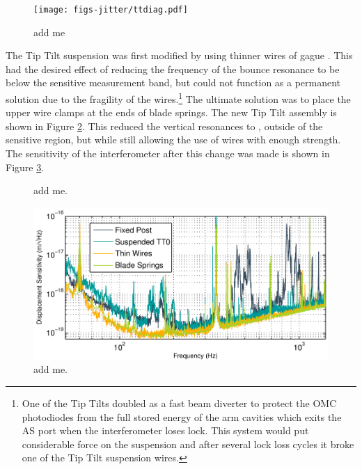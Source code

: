 \begin{figure}
  \begin{center}
  \leavevmode
  \texttt{[image: figs-jitter/ttdiag.pdf]}
  \end{center}
  \caption[add me]{add me}
  \label{fig:ttdiag}
\end{figure}

The Tip Tilt suspension was first modified by using thinner wires of gague . %
This had the desired effect of reducing the frequency of the bounce resonance to be below the sensitive measurement band, but could not function as a permanent solution due to the fragility of the wires.\footnote{One of the Tip Tilts doubled as a fast beam diverter to protect the OMC photodiodes from the full stored energy of the arm cavities which exits the AS port when the interferometer loses lock. %
This system would put considerable force on the suspension and after several lock loss cycles it broke one of the Tip Tilt suspension wires.} The ultimate solution was to place the upper wire clamps at the ends of blade springs. %
The new Tip Tilt assembly is shown in Figure \ref{fig:bladephoto}. %
This reduced the vertical resonances to , outside of the sensitive region, but while still allowing the use of wires with enough strength. %
The sensitivity of the interferometer after this change was made is shown in Figure \ref{fig:sensimprovement}.

\begin{figure}
  \begin{center}
  \leavevmode
  \end{center}
  \caption[add me]{add me.}
  \label{fig:bladephoto}
\end{figure}

\begin{figure}
  \begin{center}
  \leavevmode
  \includegraphics{figs-jitter/sensimprovement.pdf}
  \end{center}
  \caption[add me]{add me.}
  \label{fig:sensimprovement}
\end{figure}

